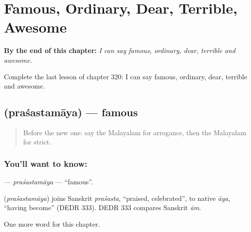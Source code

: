 
\chapter{Famous, Ordinary, Dear, Terrible, Awesome}
\label{ch:ml-famous-ordinary-dear-terrible-awesome}

\begin{chapteropening}
\textbf{By the end of this chapter:} \emph{I can say famous, ordinary, dear, terrible and awesome.}

Complete the last lesson of chapter 320: I can say famous, ordinary, dear, terrible and awesome.
\end{chapteropening}

\section[\texorpdfstring{\ml{പ്രശസ്തമായ} (praśastamāya)}{പ്രശസ്തമായ (praśastamāya)}]{ (praśastamāya) — famous}

\label{lesson:ML-C320-prasastamaya}



\begin{quote}
Before the new one: say the Malayalam for arrogance, then the Malayalam for strict.
\end{quote}

\subsection*{You'll want to know: }
\textbf{} — \emph{praśastamāya} — \textquotedblleft{}famous\textquotedblright{}.

\begin{cousinweb}
\textbf{} (\emph{praśastamāya}) joins Sanskrit \emph{praśasta}, \textquotedblleft{}praised, celebrated\textquotedblright{}, to native \emph{āya}, \textquotedblleft{}having become\textquotedblright{} (DEDR 333). DEDR 333 compares Sanskrit \emph{ām}.
\end{cousinweb}

\begin{grammarlens}[title={What you've built}]
One more word for this chapter.
\end{grammarlens}

